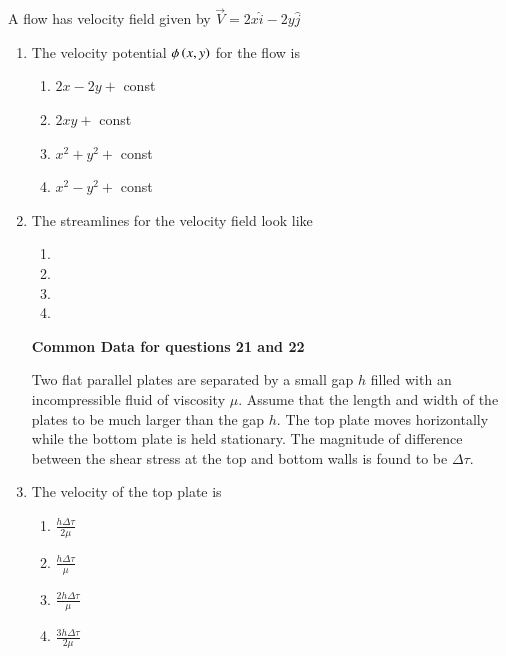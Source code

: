 \documentclass[journal]{IEEEtran}
\begin{document}
A flow has velocity field given by $\overrightarrow{V}=2x\hat{i}-2y\hat{j}$
\begin{enumerate}
\setcounter{enumi}{0}

    \item The velocity potential $\phi\left(x,y\right)$ for the flow is

        \begin{multicols}{4}
            \begin{enumerate}
                \item $2x-2y+$ const
                \item $2xy+$ const
                \item $x^2+y^2+$ const
                \item $x^2-y^2+$ const
            \end{enumerate}
        \end{multicols}

    \item The streamlines for the velocity field look like

        \begin{multicols}{4}
            \begin{enumerate}
                \item 
                \item 
                \item 
                \item 
            \end{enumerate}
        \end{multicols}
        
\textbf{Common Data for questions 21 and 22}

Two flat parallel plates are separated by a small gap $h$ filled with an incompressible fluid of viscosity $\mu$. Assume that the length and width of the plates to be much larger than the gap $h$. The top plate moves horizontally while the bottom plate is held stationary. The magnitude of difference between the shear stress at the top and bottom walls is found to be $\Delta\tau$.

    \item The velocity of the top plate is

        \begin{multicols}{4}
            \begin{enumerate}
                \item $\frac{h\Delta\tau}{2\mu}$
                \item $\frac{h\Delta\tau}{\mu}$
                \item $\frac{2h\Delta\tau}{\mu}$
                \item $\frac{3h\Delta\tau}{2\mu}$
            \end{enumerate}
        \end{multicols}



\end{enumerate}
\end{document}

